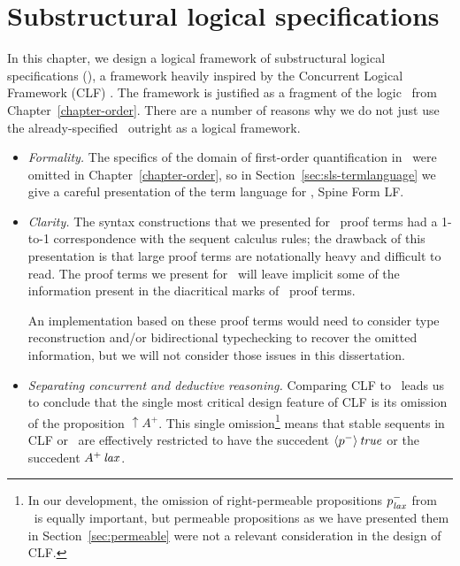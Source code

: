 \chapter{Substructural logical specifications}
\label{chapter-framework}

In this chapter, we design a logical framework of substructural
logical specifications (\sls), a framework heavily inspired by the
Concurrent Logical Framework (CLF) \cite{watkins02concurrent}. The
framework is justified as a fragment of the logic \ollll~from
Chapter~\ref{chapter-order}. 
There are a number of reasons why we do not just use the
already-specified \ollll~outright as a logical framework.
%
\smallskip
\begin{itemize}
\item{\it Formality.} The specifics of the domain of first-order
  quantification in \ollll~were omitted in Chapter~\ref{chapter-order}, so in
  Section~\ref{sec:sls-termlanguage} we give a careful presentation of
  the term language for \sls, Spine Form LF.

\item{\it Clarity.} The syntax constructions that we presented for
  \ollll~proof terms had a 1-to-1 correspondence with the sequent
  calculus rules; the drawback of this presentation is that large
  proof terms are notationally heavy and difficult to read. The proof
  terms we present for \sls~will leave implicit some of the
  information present in the diacritical marks of \ollll~proof
  terms. 

  An implementation based on these proof terms would need to consider
  type reconstruction and/or bidirectional typechecking to recover the
  omitted information, but we will not consider those issues in this
  dissertation.

\item{\it Separating concurrent and deductive reasoning.} Comparing
  CLF to \ollll~leads us to
  conclude that the single most critical design feature of CLF is its
  omission of the proposition ${\uparrow}A^+$. This single
  omission\footnote{In our development, the omission of
    right-permeable propositions $p^-_{\it lax}$ from \ollll~is equally
    important, but permeable propositions as we have presented them in
    Section~\ref{sec:permeable} were not a relevant consideration in
    the design of CLF.} means that stable sequents in CLF or \sls~are
  effectively restricted to have the succedent ${\langle {p^-} \rangle}\,{{\it true}}$
  or the succedent ${A^+}\,{{\it lax}}$.


\end{itemize}
